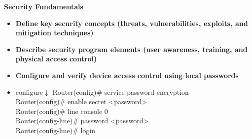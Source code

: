 \documentclass{article}
\begin{document}
\begin{flushleft}\textbf{Security Fundamentals}\end{flushleft}
\begin{itemize}
  \item \textbf{Define key security concepts (threats, vulnerabilities, exploits, and mitigation techniques)}
  \item \textbf{Describe security program elements (user awareness, training, and physical access control)}
  \item \textbf{Configure and verify device access control using local passwords}
  	\item[] configure$\downarrow$
  		Router(config)\# service password-encryption\\
  		
  		Router(config)\# enable secret \textless password\textgreater\\
  		
  		Router(config)\# line console 0\\
  		Router(config-line)\# password \textless password\textgreater\\
  		Router(config-line)\# login\\
  		

\end{itemize}
\end{document}
